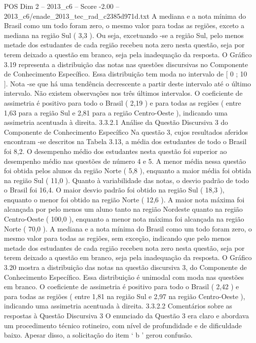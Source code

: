 \begin{textsample}{POS Dim 2 – 2013\_c6 – Score -2.00 – 2013\_c6/enade\_2013\_tec\_rad\_c2385d971d.txt}
A mediana e a nota mínima do Brasil como um todo foram zero, o mesmo valor para todas as regiões, exceto a mediana na região Sul ( 3,3 ).
Ou seja, excetuando -se a região Sul, pelo menos metade dos estudantes de cada região recebeu nota zero nesta questão, seja por terem deixado a questão em branco, seja pela inadequação da resposta.
O Gráfico 3.19 representa a distribuição das notas nas questões discursivas no Componente de Conhecimento Específico.
Essa distribuição tem moda no intervalo de [ 0 ; 10 ].
Nota -se que há uma tendência decrescente a partir deste intervalo até o último intervalo.
Não existem observações nos três últimos intervalos.
O coeficiente de assimetria é positivo para todo o Brasil ( 2,19 ) e para todas as regiões ( entre 1,63 para a região Sul e 2,81 para a região Centro-Oeste ), indicando uma assimetria acentuada à direita. 3.3.2.1 Análise da Questão Discursiva 3 do Componente de Conhecimento Específico Na questão 3, cujos resultados aferidos encontram -se descritos na Tabela 3.13, a média dos estudantes de todo o Brasil foi 8,2.
O desempenho médio dos estudantes nesta questão foi superior ao desempenho médio nas questões de número 4 e 5.
A menor média nessa questão foi obtida pelos alunos da região Norte ( 5,8 ), enquanto a maior média foi obtida na região Sul ( 11,0 ).
Quanto à variabilidade das notas, o desvio padrão de todo o Brasil foi 16,4.
O maior desvio padrão foi obtido na região Sul ( 18,3 ), enquanto o menor foi obtido na região Norte ( 12,6 ).
A maior nota máxima foi alcançada por pelo menos um aluno tanto na região Nordeste quanto na região Centro-Oeste ( 100,0 ), enquanto a menor nota máxima foi alcançada na região Norte ( 70,0 ).
A mediana e a nota mínima do Brasil como um todo foram zero, o mesmo valor para todas as regiões, sem exceção, indicando que pelo menos metade dos estudantes de cada região recebeu nota zero nesta questão, seja por terem deixado a questão em branco, seja pela inadequação da resposta.
O Gráfico 3.20 mostra a distribuição das notas na questão discursiva 3, do Componente de Conhecimento Específico.
Essa distribuição é unimodal com moda nas questões em branco.
O coeficiente de assimetria é positivo para todo o Brasil ( 2,42 ) e para todas as regiões ( entre 1,81 na região Sul e 2,97 na região Centro-Oeste ), indicando uma assimetria acentuada à direita. 3.3.2.2 Comentários sobre as respostas à Questão Discursiva 3 O enunciado da Questão 3 era claro e abordava um procedimento técnico rotineiro, com nível de profundidade e de dificuldade baixo.
Apesar disso, a solicitação do item ‘ b ’ gerou confusão.

\end{textsample}
